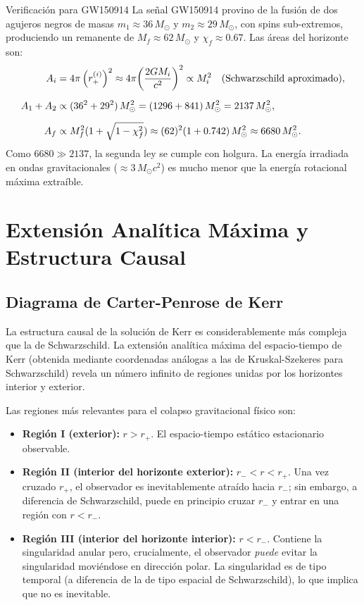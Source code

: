 \begin{ejemplo}{Verificación para GW150914}{}
La señal GW150914 provino de la fusión de dos agujeros negros de masas $m_1 \approx 36\,M_\odot$ y $m_2 \approx 29\,M_\odot$, con spins sub-extremos, produciendo un remanente de $M_f \approx 62\,M_\odot$ y $\chi_f \approx 0.67$. Las áreas del horizonte son:
\begin{align}
  A_i &= 4\pi\left(r_+^{(i)}\right)^2 \approx 4\pi\!\left(\frac{2GM_i}{c^2}\right)^2 \propto M_i^2
  \quad (\text{Schwarzschild aproximado}),\nl
  A_1 + A_2 &\propto (36^2 + 29^2)\,M_\odot^2 = (1296 + 841)\,M_\odot^2 = 2137\,M_\odot^2,\nl
  A_f &\propto M_f^2(1 + \sqrt{1-\chi_f^2}) \approx (62)^2(1 + 0.742)\,M_\odot^2 \approx 6680\,M_\odot^2.
\end{align}
Como $6680 \gg 2137$, la segunda ley se cumple con holgura. La energía irradiada en ondas gravitacionales ($\approx 3\,M_\odot c^2$) es mucho menor que la energía rotacional máxima extraíble.
\end{ejemplo}

\section{Extensión Analítica Máxima y Estructura Causal}
\label{sec:kruskal_kerr}

\subsection{Diagrama de Carter-Penrose de Kerr}

La estructura causal de la solución de Kerr es considerablemente más compleja que la de Schwarzschild. La extensión analítica máxima del espacio-tiempo de Kerr (obtenida mediante coordenadas análogas a las de Kruskal-Szekeres para Schwarzschild) revela un número infinito de regiones unidas por los horizontes interior y exterior.

Las regiones más relevantes para el colapso gravitacional físico son:
\begin{itemize}
  \item \textbf{Región I (exterior):} $r > r_+$. El espacio-tiempo estático estacionario observable.
  \item \textbf{Región II (interior del horizonte exterior):} $r_- < r < r_+$. Una vez cruzado $r_+$, el observador es inevitablemente atraído hacia $r_-$; sin embargo, a diferencia de Schwarzschild, puede en principio cruzar $r_-$ y entrar en una región con $r < r_-$.
  \item \textbf{Región III (interior del horizonte interior):} $r < r_-$. Contiene la singularidad anular pero, crucialmente, el observador \emph{puede} evitar la singularidad moviéndose en dirección polar. La singularidad es de tipo temporal (a diferencia de la de tipo espacial de Schwarzschild), lo que implica que no es inevitable.
\end{itemize}

